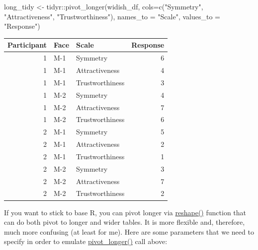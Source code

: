 \documentclass[
]{book}
\newenvironment{Shaded}{\begin{snugshade}}{\end{snugshade}}
\newcommand{\AttributeTok}[1]{\textcolor[rgb]{0.77,0.63,0.00}{#1}}
\newcommand{\FunctionTok}[1]{\textcolor[rgb]{0.00,0.00,0.00}{#1}}
\newcommand{\NormalTok}[1]{#1}
\newcommand{\OtherTok}[1]{\textcolor[rgb]{0.56,0.35,0.01}{#1}}
\newcommand{\SpecialCharTok}[1]{\textcolor[rgb]{0.00,0.00,0.00}{#1}}
\newcommand{\StringTok}[1]{\textcolor[rgb]{0.31,0.60,0.02}{#1}}
\begin{document}
\begin{Shaded}
\begin{Highlighting}[]
\NormalTok{long\_tidy }\OtherTok{\textless{}{-}}\NormalTok{ tidyr}\SpecialCharTok{::}\FunctionTok{pivot\_longer}\NormalTok{(widish\_df, }
                               \AttributeTok{cols=}\FunctionTok{c}\NormalTok{(}\StringTok{"Symmetry"}\NormalTok{, }\StringTok{"Attractiveness"}\NormalTok{, }\StringTok{"Trustworthiness"}\NormalTok{),}
                               \AttributeTok{names\_to =} \StringTok{"Scale"}\NormalTok{,}
                               \AttributeTok{values\_to =} \StringTok{"Response"}\NormalTok{)}
\end{Highlighting}
\end{Shaded}

\begin{tabular}{r|l|l|r}
\hline
Participant & Face & Scale & Response\\
\hline
1 & M-1 & Symmetry & 6\\
\hline
1 & M-1 & Attractiveness & 4\\
\hline
1 & M-1 & Trustworthiness & 3\\
\hline
1 & M-2 & Symmetry & 4\\
\hline
1 & M-2 & Attractiveness & 7\\
\hline
1 & M-2 & Trustworthiness & 6\\
\hline
2 & M-1 & Symmetry & 5\\
\hline
2 & M-1 & Attractiveness & 2\\
\hline
2 & M-1 & Trustworthiness & 1\\
\hline
2 & M-2 & Symmetry & 3\\
\hline
2 & M-2 & Attractiveness & 7\\
\hline
2 & M-2 & Trustworthiness & 2\\
\hline
\end{tabular}

If you want to stick to base R, you can pivot longer via \href{https://stat.ethz.ch/R-manual/R-patched/library/stats/html/reshape.html}{reshape()} function that can do both pivot to longer and wider tables. It is more flexible and, therefore, much more confusing (at least for me). Here are some parameters that we need to specify in order to emulate \href{https://tidyr.tidyverse.org/reference/pivot_longer.html}{pivot\_longer()} call above:
\end{document}
